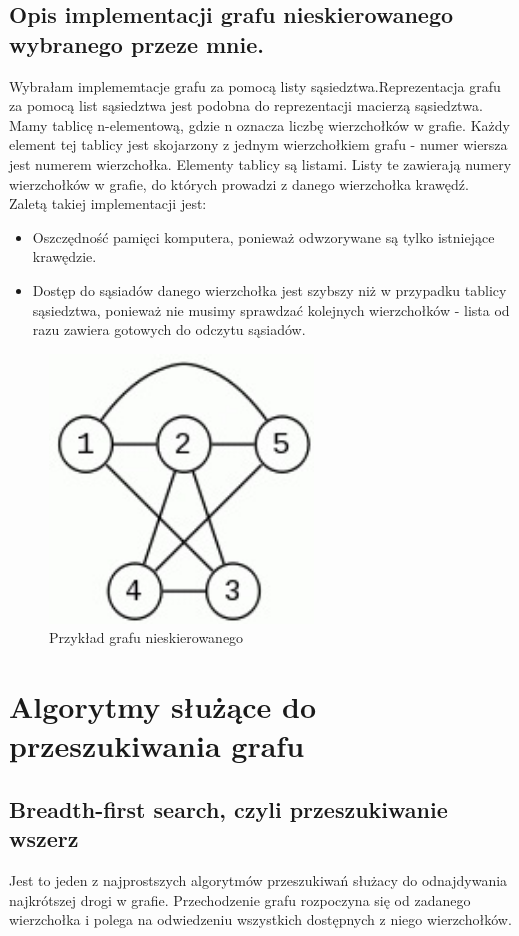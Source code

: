 \documentclass[11pt]{article}
\begin{document}
\subsection{Opis implementacji grafu nieskierowanego wybranego przeze mnie.}

Wybrałam implememtacje grafu za pomocą listy sąsiedztwa.Reprezentacja grafu za pomocą list sąsiedztwa jest podobna do reprezentacji macierzą sąsiedztwa. Mamy tablicę n-elementową, gdzie n oznacza liczbę wierzchołków w grafie. Każdy element tej tablicy jest skojarzony z jednym wierzchołkiem grafu - numer wiersza jest numerem wierzchołka. Elementy tablicy są listami. Listy te zawierają numery wierzchołków w grafie, do których prowadzi z danego wierzchołka krawędź.
\\Zaletą takiej implementacji jest:
\begin{itemize}
\item  Oszczędność pamięci komputera, ponieważ odwzorywane są  tylko istniejące krawędzie.
\item Dostęp do sąsiadów danego wierzchołka jest szybszy niż w przypadku tablicy sąsiedztwa, ponieważ nie musimy sprawdzać kolejnych wierzchołków - lista od razu zawiera gotowych do odczytu sąsiadów.
\end{itemize}
  \begin{figure}[ht!] 
\centering
 \includegraphics[width=70mm]{graf}
 \caption{Przykład grafu nieskierowanego} 
\label{overflow}
 \end{figure}
\newpage
\section{Algorytmy służące do przeszukiwania grafu}
\subsection{Breadth-first search, czyli przeszukiwanie wszerz}
Jest to jeden z najprostszych algorytmów przeszukiwań służacy do odnajdywania najkrótszej drogi w grafie. Przechodzenie grafu rozpoczyna się od zadanego wierzchołka i polega na odwiedzeniu wszystkich dostępnych z niego wierzchołków.
\end{document}
